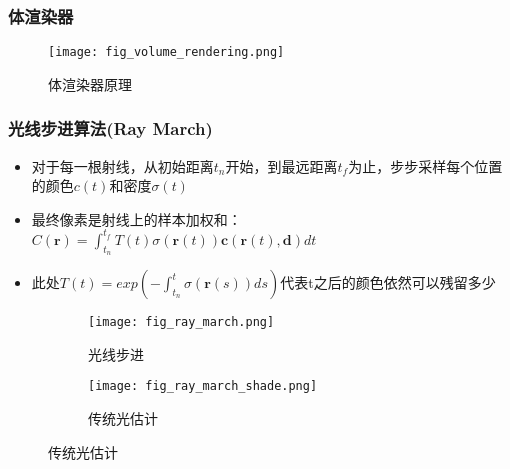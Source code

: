 \begin{frame}
    \frametitle{体渲染器}
    \begin{figure}
        \centering
        \texttt{[image: fig\_volume\_rendering.png]}
        \caption[short]{体渲染器原理}
    \end{figure}
\end{frame}

\begin{frame}
    \frametitle{光线步进算法(Ray March)}
    \begin{itemize}
        \item 对于每一根射线，从初始距离$t_n$开始，到最远距离$t_f$为止，步步采样每个位置的颜色$c(t)$和密度$\sigma(t)$
        \item 最终像素是射线上的样本加权和：$C(\mathbf{r})=\int_{t_n}^{t_f}T(t)\sigma(\mathbf{r}(t))\mathbf{c}(\mathbf{r}(t),\mathbf{d})dt$
        \item 此处$T(t)=exp(-\int_{t_n}^{t}\sigma(\mathbf{r}(s))ds)$代表t之后的颜色依然可以残留多少
    \end{itemize}
    \begin{figure}
        \begin{subfigure}{0.48\textwidth}
            \texttt{[image: fig\_ray\_march.png]}
            \caption[short]{光线步进}
        \end{subfigure}
        \begin{subfigure}{0.48\textwidth}
            \texttt{[image: fig\_ray\_march\_shade.png]}
            \caption[short]{传统光估计}
        \end{subfigure}
    \end{figure}
\end{frame}